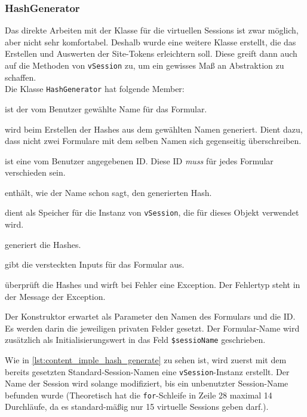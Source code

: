 \subsubsection{HashGenerator}
Das direkte Arbeiten mit der Klasse für die virtuellen Sessions ist zwar möglich, aber nicht sehr komfortabel. Deshalb wurde eine weitere Klasse erstellt, die das Erstellen und Auswerten der Site-Tokens erleichtern soll. Diese greift dann auch auf die Methoden von \texttt{vSession} zu, um ein gewisses Maß an Abstraktion zu schaffen.\\
Die Klasse \texttt{HashGenerator} hat folgende Member:
\begin{description}[style=nextline]
	\item[\texttt{private \$name}] ist der vom Benutzer gewählte Name für das Formular.
	\item[\texttt{private \$sessionName}] wird beim Erstellen der Hashes aus dem gewählten Namen generiert. Dient dazu, dass nicht zwei Formulare mit dem selben Namen sich gegenseitig überschreiben.
	\item[\texttt{private \$id}] ist eine vom Benutzer angegebenen ID. Diese ID \textit{muss} für jedes Formular verschieden sein.
	\item[\texttt{private \$hash}] enthält, wie der Name schon sagt, den generierten Hash.
	\item[\texttt{private \$virtualSession}] dient als Speicher für die Instanz von \texttt{vSession}, die für dieses Objekt verwendet wird.
	\item[\texttt{public function generate()}] generiert die Hashes.
	\item[\texttt{public function printForm()}] gibt die versteckten Inputs für das Formular aus.
	\item[\texttt{public function check()}] überprüft die Hashes und wirft bei Fehler eine Exception. Der Fehlertyp steht in der Message der Exception.
\end{description}
Der Konstruktor erwartet als Parameter den Namen des Formulars und die ID. Es werden darin die jeweiligen privaten Felder gesetzt. Der Formular-Name wird zusätzlich als Initialisierungswert in das Feld \texttt{\$sessioName} geschrieben.

Wie in \autoref{lst:content_imple_hash_generate} zu sehen ist, wird zuerst mit dem bereits gesetzten Standard-Session-Namen eine \texttt{vSession}-Instanz erstellt. Der Name der Session wird solange modifiziert, bis ein unbenutzter Session-Name befunden wurde (Theoretisch hat die \texttt{for}-Schleife in Zeile 28 maximal 14 Durchläufe, da es standard-mäßig nur 15 virtuelle Sessions geben darf.).\\
